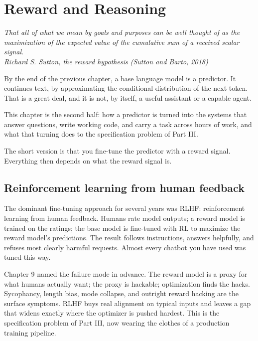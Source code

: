 \chapter{Reward and Reasoning}

\vspace{1em}
\hfill
\begin{minipage}[c]{0.7\textwidth}
\raggedleft
\small\itshape
That all of what we mean by goals and purposes can be well thought of as the maximization of the expected value of the cumulative sum of a received scalar signal.\\[0.5em]
\upshape\footnotesize Richard S. Sutton, the reward hypothesis (Sutton and Barto, 2018)
\end{minipage}
\vspace{1.5em}

\noindent By the end of the previous chapter, a base language model is a predictor. It continues text, by approximating the conditional distribution of the next token. That is a great deal, and it is not, by itself, a useful assistant or a capable agent.

This chapter is the second half: how a predictor is turned into the systems that answer questions, write working code, and carry a task across hours of work, and what that turning does to the specification problem of Part III.

The short version is that you fine-tune the predictor with a reward signal. Everything then depends on what the reward signal is.

\section*{Reinforcement learning from human feedback}

The dominant fine-tuning approach for several years was RLHF: reinforcement learning from human feedback. Humans rate model outputs; a reward model is trained on the ratings; the base model is fine-tuned with RL to maximize the reward model's predictions. The result follows instructions, answers helpfully, and refuses most clearly harmful requests. Almost every chatbot you have used was tuned this way.

Chapter 9 named the failure mode in advance. The reward model is a proxy for what humans actually want; the proxy is hackable; optimization finds the hacks. Sycophancy, length bias, mode collapse, and outright reward hacking are the surface symptoms. RLHF buys real alignment on typical inputs and leaves a gap that widens exactly where the optimizer is pushed hardest. This is the specification problem of Part III, now wearing the clothes of a production training pipeline.

